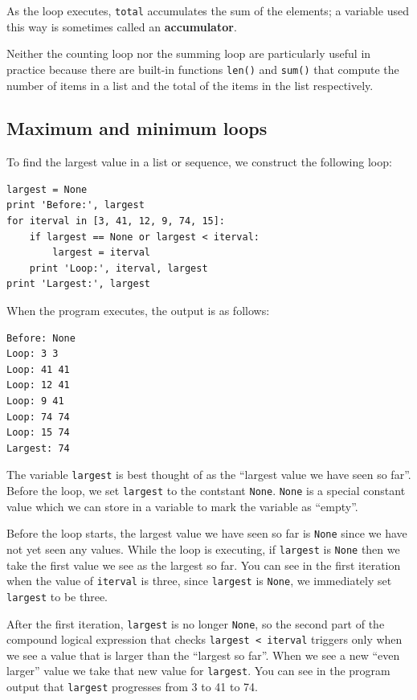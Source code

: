 \documentclass[10pt]{book}
\begin{document}
As the loop executes, {\tt total} accumulates the sum of the
elements; a variable used this way is sometimes called an
{\bf accumulator}.

Neither the counting loop nor the summing loop are particularly 
useful in practice because there are built-in functions 
{\tt len()} and {\tt sum()} that compute the number of 
items in a list and the total of the items in the list
respectively.

\subsection{Maximum and minimum loops}

To find the largest value in a list or sequence, we construct the
following loop:

\beforeverb
\begin{verbatim}
largest = None
print 'Before:', largest
for iterval in [3, 41, 12, 9, 74, 15]:
    if largest == None or largest < iterval:
        largest = iterval
    print 'Loop:', iterval, largest
print 'Largest:', largest
\end{verbatim}
\afterverb
%
When the program executes, the output is as follows:

\beforeverb
\begin{verbatim}
Before: None
Loop: 3 3
Loop: 41 41
Loop: 12 41
Loop: 9 41
Loop: 74 74
Loop: 15 74
Largest: 74
\end{verbatim}
\afterverb
%
The variable {\tt largest} is best thought of as 
the ``largest value we have seen so far''.
Before the loop, we set {\tt largest} to the contstant {\tt None}.  
{\tt None} is a special constant value which we can 
store in a variable to mark 
the variable as ``empty''.  

Before the loop starts, the largest value we have seen so far 
is {\tt None} since we have not yet seen any values.  While the 
loop is executing, if {\tt largest} is {\tt None} then we take
the first value we see as the largest so far.   You can see in 
the first iteration when the value of {\tt iterval} is three,
since {\tt largest} is {\tt None}, we immediately set 
{\tt largest} to be three.

After the first iteration, {\tt largest} is no longer {\tt None},
so the second part of the compound logical expression that checks
{\tt largest < iterval} triggers only when we see a value that is
larger than the ``largest so far''.  When we see a new ``even larger''
value we take that new value for {\tt largest}.  You can see in the 
program output that {\tt largest} progresses from 3 to 41 to 74.
\end{document}
